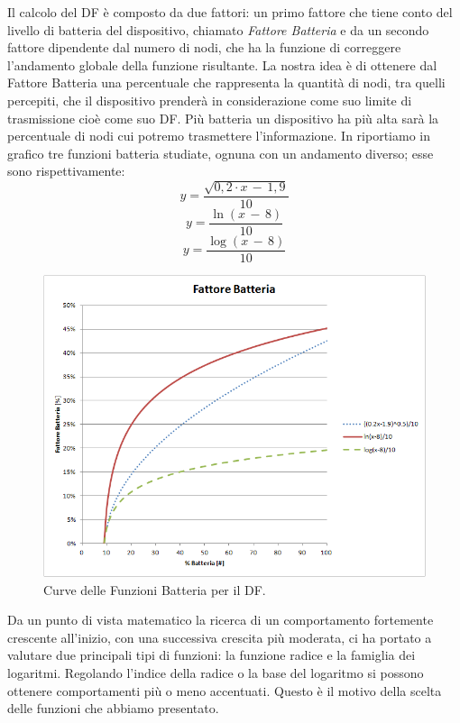 Il calcolo del \acs{DF} è composto da due fattori: un primo fattore che tiene conto del livello di batteria del dispositivo, chiamato \textit{Fattore Batteria} e da un secondo fattore dipendente dal numero di nodi, che ha la funzione di correggere l'andamento globale della funzione risultante. La nostra idea è di ottenere dal Fattore Batteria una percentuale che rappresenta la quantità di nodi, tra quelli percepiti, che il dispositivo prenderà in considerazione come suo limite di trasmissione cioè come suo \acs{DF}. Più batteria un dispositivo ha più alta sarà la percentuale di nodi cui potremo trasmettere l'informazione. In  riportiamo in grafico tre funzioni batteria studiate, ognuna con un andamento diverso; esse sono rispettivamente:
\begin{equation}
	\label{eq:df_bat_radq}
	y=\dfrac{\sqrt{0,2\cdot x\,-\,1,9}}{10}
\end{equation}
\begin{equation}
	\label{eq:df_bat_ln}
	y=\dfrac{\ln\left(x\,-\,8\right) }{10}
\end{equation}
\begin{equation}
	\label{eq:df_bat_log}
	y=\dfrac{\log\left(x\,-\,8\right) }{10}
\end{equation}
\begin{figure}[tb]
	\centering
	\includegraphics[width=0.9\linewidth, keepaspectratio]{Images/grafici_usati/DF_battery_factor}
	\caption[Curve Fattore Fatteria (DF).]{Curve delle Funzioni Batteria per il \acs{DF}.}
	\label{fig:DF_battery_factor}
\end{figure}
Da un punto di vista matematico la ricerca di un comportamento fortemente crescente all'inizio, con una successiva crescita più moderata, ci ha portato a valutare due principali tipi di funzioni: la funzione radice e la famiglia dei logaritmi. Regolando l'indice della radice o la base del logaritmo si possono ottenere comportamenti più o meno accentuati. Questo è il motivo della scelta delle funzioni che abbiamo presentato.
